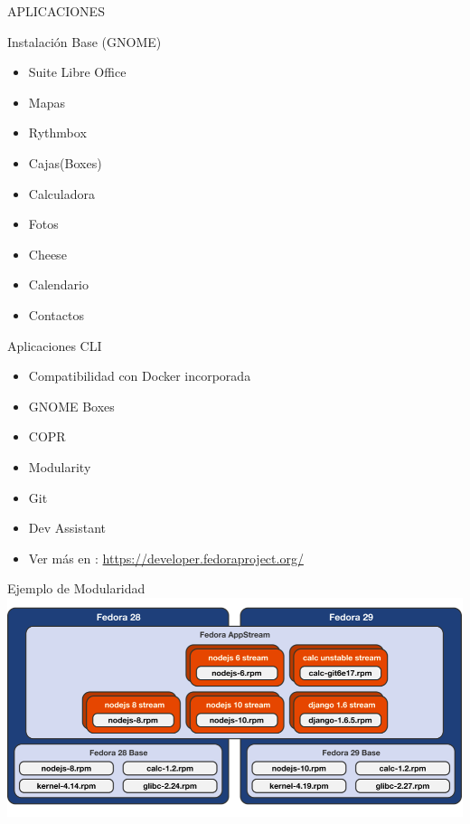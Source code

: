 \documentclass[presentation]{beamer}
\begin{document}
\begin{frame}[label=sec-11]{APLICACIONES}
\end{frame}
\begin{frame}[label=sec-12]{Instalación Base (GNOME)}
\begin{itemize}
\item Suite Libre Office
\item Mapas
\item Rythmbox
\item Cajas(Boxes)
\item Calculadora
\item Fotos
\item Cheese
\item Calendario
\item Contactos
\end{itemize}
\end{frame}
\begin{frame}[label=sec-13]{Aplicaciones CLI}
\begin{itemize}
\item Compatibilidad con Docker incorporada
\item GNOME Boxes
\item COPR
\item Modularity
\item Git
\item Dev Assistant
\item Ver más en : \url{https://developer.fedoraproject.org/}
\end{itemize}
\end{frame}
\begin{frame}[label=sec-14]{Ejemplo de Modularidad}
\includegraphics[width=.9\linewidth]{./modularity.png}
\end{frame}
\end{document}
